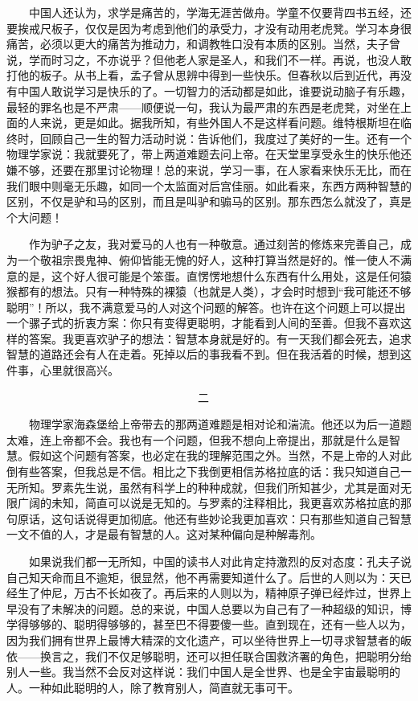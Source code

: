 　　中国人还认为，求学是痛苦的，学海无涯苦做舟。学童不仅要背四书五经，还要挨戒尺板子，仅仅是因为考虑到他们的承受力，才没有动用老虎凳。学习本身很痛苦，必须以更大的痛苦为推动力，和调教牲口没有本质的区别。当然，夫子曾说，学而时习之，不亦说乎？但他老人家是圣人，和我们不一样。再说，也没人敢打他的板子。从书上看，孟子曾从思辨中得到一些快乐。但春秋以后到近代，再没有中国人敢说学习是快乐的了。一切智力的活动都是如此，谁要说动脑子有乐趣，最轻的罪名也是不严肃——顺便说一句，我认为最严肃的东西是老虎凳，对坐在上面的人来说，更是如此。据我所知，有些外国人不是这样看问题。维特根斯坦在临终时，回顾自己一生的智力活动时说：告诉他们，我度过了美好的一生。还有一个物理学家说：我就要死了，带上两道难题去问上帝。在天堂里享受永生的快乐他还嫌不够，还要在那里讨论物理！总的来说，学习一事，在人家看来快乐无比，而在我们眼中则毫无乐趣，如同一个太监面对后宫佳丽。如此看来，东西方两种智慧的区别，不仅是驴和马的区别，而且是叫驴和骟马的区别。那东西怎么就没了，真是个大问题！ 

　　作为驴子之友，我对爱马的人也有一种敬意。通过刻苦的修炼来完善自己，成为一个敬祖宗畏鬼神、俯仰皆能无愧的好人，这种打算当然是好的。惟一使人不满意的是，这个好人很可能是个笨蛋。直愣愣地想什么东西有什么用处，这是任何猿猴都有的想法。只有一种特殊的裸猿（也就是人类），才会时时想到“我可能还不够聪明”！所以，我不满意爱马的人对这个问题的解答。也许在这个问题上可以提出一个骡子式的折衷方案：你只有变得更聪明，才能看到人间的至善。但我不喜欢这样的答案。我更喜欢驴子的想法：智慧本身就是好的。有一天我们都会死去，追求智慧的道路还会有人在走着。死掉以后的事我看不到。但在我活着的时候，想到这件事，心里就很高兴。 


　　　　　　　　　　　　　　　　　二 

　　物理学家海森堡给上帝带去的那两道难题是相对论和湍流。他还以为后一道题太难，连上帝都不会。我也有一个问题，但我不想向上帝提出，那就是什么是智慧。假如这个问题有答案，也必定在我的理解范围之外。当然，不是上帝的人对此倒有些答案，但我总是不信。相比之下我倒更相信苏格拉底的话：我只知道自己一无所知。罗素先生说，虽然有科学上的种种成就，但我们所知甚少，尤其是面对无限广阔的未知，简直可以说是无知的。与罗素的注释相比，我更喜欢苏格拉底的那句原话，这句话说得更加彻底。他还有些妙论我更加喜欢：只有那些知道自己智慧一文不值的人，才是最有智慧的人。这对某种偏向是种解毒剂。 

　　如果说我们都一无所知，中国的读书人对此肯定持激烈的反对态度：孔夫子说自己知天命而且不逾矩，很显然，他不再需要知道什么了。后世的人则以为：天已经生了仲尼，万古不长如夜了。再后来的人则以为，精神原子弹已经炸过，世界上早没有了未解决的问题。总的来说，中国人总要以为自己有了一种超级的知识，博学得够够的、聪明得够够的，甚至巴不得要傻一些。直到现在，还有一些人以为，因为我们拥有世界上最博大精深的文化遗产，可以坐待世界上一切寻求智慧者的皈依——换言之，我们不仅足够聪明，还可以担任联合国救济署的角色，把聪明分绐别人一些。我当然不会反对这样说：我们中国人是全世界、也是全宇宙最聪明的人。一种如此聪明的人，除了教育别人，简直就无事可干。 

